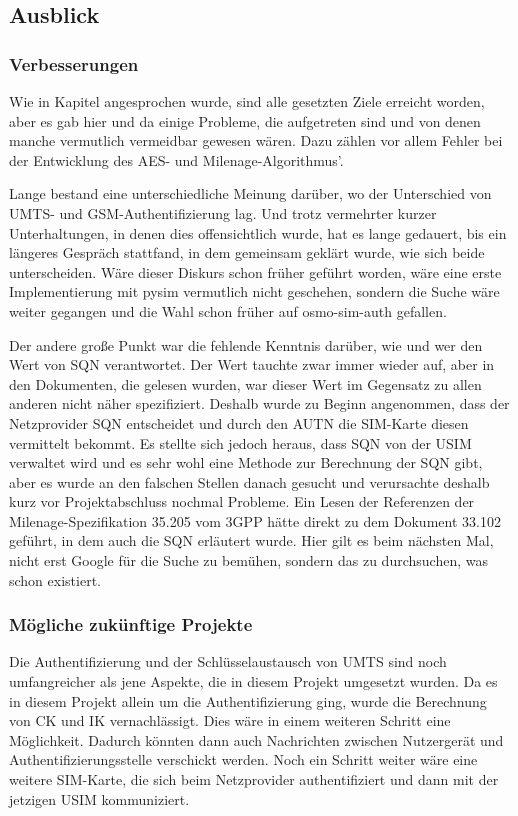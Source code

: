 	\subsection[Ausblick (Heumann)]{Ausblick}
		\subsubsection[Verbesserungen (Heumann)]{Verbesserungen}
		Wie in Kapitel  angesprochen wurde, sind alle gesetzten
		Ziele erreicht worden, aber es gab hier und da einige Probleme, die aufgetreten
		sind und von denen manche vermutlich vermeidbar gewesen wären. Dazu zählen vor
		allem Fehler bei der Entwicklung des AES- und Milenage-Algorithmus'.
		
		Lange bestand eine unterschiedliche Meinung darüber, wo der Unterschied von UMTS-
		und GSM-Authentifizierung lag. Und trotz vermehrter kurzer Unterhaltungen, in
		denen dies offensichtlich wurde, hat es lange gedauert, bis ein längeres Gespräch
		stattfand, in dem gemeinsam geklärt wurde, wie sich beide unterscheiden. Wäre
		dieser Diskurs schon früher geführt worden, wäre eine erste Implementierung mit
		pysim vermutlich nicht geschehen, sondern die Suche wäre weiter gegangen und
		die Wahl schon früher auf osmo-sim-auth gefallen.
		
		Der andere große Punkt war die fehlende Kenntnis darüber, wie und wer den Wert von SQN
		verantwortet. Der Wert tauchte zwar immer wieder auf, aber in den Dokumenten,
		die gelesen wurden, war dieser Wert im Gegensatz zu allen anderen nicht näher
		spezifiziert. Deshalb wurde zu Beginn angenommen, dass der Netzprovider SQN
		entscheidet und durch den AUTN die SIM-Karte diesen vermittelt bekommt. Es
		stellte sich jedoch heraus, dass SQN von der USIM verwaltet wird und es sehr wohl
		eine Methode zur Berechnung der SQN gibt, aber es wurde an den falschen Stellen
		danach gesucht und verursachte deshalb kurz vor Projektabschluss nochmal Probleme.
		Ein Lesen der Referenzen der Milenage-Spezifikation 35.205 vom 3GPP hätte direkt
		zu dem Dokument 33.102 geführt, in dem auch die SQN erläutert wurde. Hier gilt
		es beim nächsten Mal, nicht erst Google für die Suche zu bemühen, sondern das zu
		durchsuchen, was schon existiert.
		
		\subsubsection[Mögliche zukünftige Projekte (Heumann)]{Mögliche zukünftige Projekte}
		Die Authentifizierung und der Schlüsselaustausch von UMTS sind noch umfangreicher
		als jene Aspekte, die in diesem Projekt umgesetzt wurden. Da es in diesem Projekt allein um die
		Authentifizierung ging, wurde die Berechnung von CK und IK vernachlässigt. Dies
		wäre in einem weiteren Schritt eine Möglichkeit. Dadurch könnten dann auch
		Nachrichten zwischen Nutzergerät und Authentifizierungsstelle verschickt werden.
		Noch ein Schritt weiter wäre eine weitere SIM-Karte, die sich beim
		Netzprovider authentifiziert und dann mit der jetzigen USIM kommuniziert.

